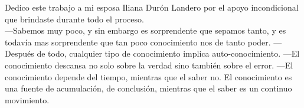 
%






Dedico este trabajo a mi esposa Iliana Dur\'on Landero por el apoyo incondicional
que brindaste durante todo el proceso.\\


---Sabemos muy poco, y sin embargo es
sorprendente que sepamos tanto, y es todav\'ia mas sorprendente que tan poco
conocimiento nos de tanto poder.
---Despu\'es de todo, cualquier tipo de conocimiento implica auto-conocimiento.
---El conocimiento descansa no solo sobre la verdad sino tambi\'en sobre el error.
---El conocimiento depende del tiempo, mientras que el saber no. El
conocimiento es una fuente de acumulación, de conclusión, mientras que el saber
es un continuo movimiento.


